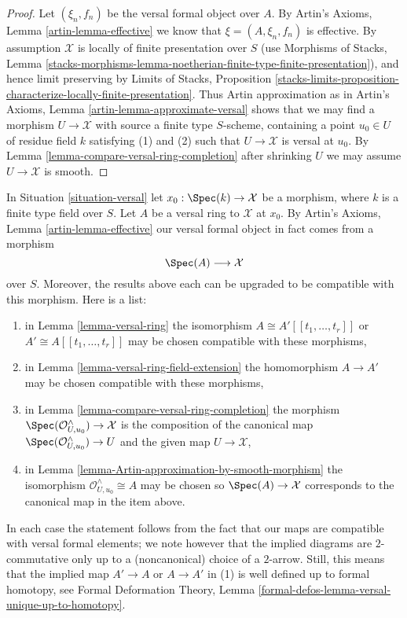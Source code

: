 \begin{proof}
Let $(\xi_n, f_n)$ be the versal formal object over $A$.
By Artin's Axioms, Lemma \ref{artin-lemma-effective}
we know that $\xi = (A, \xi_n, f_n)$ is effective.
By assumption $\mathcal{X}$ is locally of finite presentation over $S$
(use Morphisms of Stacks, Lemma
\ref{stacks-morphisms-lemma-noetherian-finite-type-finite-presentation}),
and hence limit preserving by Limits of Stacks, Proposition
\ref{stacks-limits-proposition-characterize-locally-finite-presentation}.
Thus Artin approximation as in
Artin's Axioms, Lemma \ref{artin-lemma-approximate-versal}
shows that we may find a morphism $U \to \mathcal{X}$ with
source a finite type $S$-scheme, containing a point $u_0 \in U$
of residue field $k$ satisfying (1) and (2) such that $U \to \mathcal{X}$
is versal at $u_0$. By Lemma \ref{lemma-compare-versal-ring-completion}
after shrinking $U$ we may assume $U \to \mathcal{X}$ is smooth.
\end{proof}

\begin{remark}
\label{remark-upgrade}
In Situation \ref{situation-versal} let $x_0 : \Spec(k) \to \mathcal{X}$
be a morphism, where $k$ is a finite type field over $S$.
Let $A$ be a versal ring to $\mathcal{X}$ at $x_0$. By Artin's Axioms,
Lemma \ref{artin-lemma-effective} our versal formal object
in fact comes from a morphism
$$
\Spec(A) \longrightarrow \mathcal{X}
$$
over $S$. Moreover, the results above each can be upgraded to be compatible
with this morphism. Here is a list:
\begin{enumerate}
\item in Lemma \ref{lemma-versal-ring} the isomorphism
$A \cong A'[[t_1, \ldots, t_r]]$ or $A' \cong A[[t_1, \ldots, t_r]]$
may be chosen compatible with these morphisms,
\item in Lemma \ref{lemma-versal-ring-field-extension} the
homomorphism $A \to A'$ may be chosen compatible with these morphisms,
\item in Lemma \ref{lemma-compare-versal-ring-completion}
the morphism $\Spec(\mathcal{O}_{U, u_0}^\wedge) \to \mathcal{X}$
is the composition of the canonical map
$\Spec(\mathcal{O}_{U, u_0}^\wedge) \to U$ and the given map
$U \to \mathcal{X}$,
\item in Lemma \ref{lemma-Artin-approximation-by-smooth-morphism}
the isomorphism $\mathcal{O}_{U, u_0}^\wedge \cong A$ may
be chosen so $\Spec(A) \to \mathcal{X}$ corresponds to the canonical map
in the item above.
\end{enumerate}
In each case the statement follows from the fact that our maps are
compatible with versal formal elements; we note however that the
implied diagrams are $2$-commutative only up to a (noncanonical)
choice of a $2$-arrow. Still, this means that the implied map $A' \to A$
or $A \to A'$ in (1) is well defined up to formal homotopy, see
Formal Deformation Theory, Lemma
\ref{formal-defos-lemma-versal-unique-up-to-homotopy}.
\end{remark}

